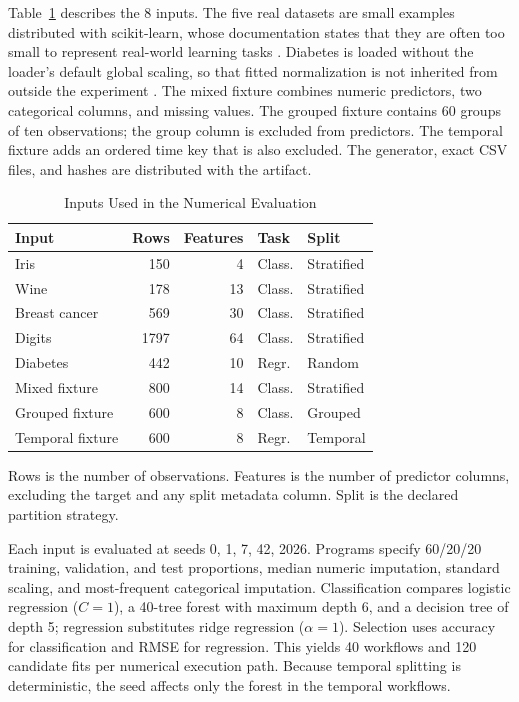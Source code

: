\documentclass[lettersize,journal]{IEEEtran}
\begin{document}
Table~\ref{tab:data} describes the 8 inputs. The five real datasets are small examples distributed with scikit-learn, whose documentation states that they are often too small to represent real-world learning tasks \cite{sklearndata}. Diabetes is loaded without the loader's default global scaling, so that fitted normalization is not inherited from outside the experiment \cite{sklearndiabetes}. The mixed fixture combines numeric predictors, two categorical columns, and missing values. The grouped fixture contains 60 groups of ten observations; the group column is excluded from predictors. The temporal fixture adds an ordered time key that is also excluded. The generator, exact CSV files, and hashes are distributed with the artifact.

\begin{table}[t]
\caption{Inputs Used in the Numerical Evaluation}
\label{tab:data}\centering\footnotesize
\begin{tabular}{lrrll}\toprule
Input & Rows & Features & Task & Split\\\midrule
Iris & 150 & 4 & Class. & Stratified\\
Wine & 178 & 13 & Class. & Stratified\\
Breast cancer & 569 & 30 & Class. & Stratified\\
Digits & 1797 & 64 & Class. & Stratified\\
Diabetes & 442 & 10 & Regr. & Random\\
Mixed fixture & 800 & 14 & Class. & Stratified\\
Grouped fixture & 600 & 8 & Class. & Grouped\\
Temporal fixture & 600 & 8 & Regr. & Temporal\\
\bottomrule
\end{tabular}

\smallskip
\parbox{0.95\columnwidth}{\footnotesize Rows is the number of observations. Features is the number of predictor columns, excluding the target and any split metadata column. Split is the declared partition strategy.}
\end{table}

Each input is evaluated at seeds 0, 1, 7, 42, 2026. Programs specify 60/20/20 training, validation, and test proportions, median numeric imputation, standard scaling, and most-frequent categorical imputation. Classification compares logistic regression ($C=1$), a 40-tree forest with maximum depth 6, and a decision tree of depth 5; regression substitutes ridge regression ($\alpha=1$). Selection uses accuracy for classification and RMSE for regression. This yields 40 workflows and 120 candidate fits per numerical execution path. Because temporal splitting is deterministic, the seed affects only the forest in the temporal workflows.
\end{document}

